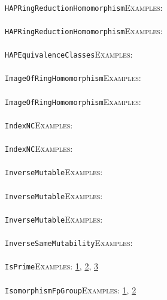 \documentclass[a4paper,11pt]{report}
\begin{document}
{{ \\
 \texttt{HAPRingReductionHomomorphism}{\nobreakspace}{\nobreakspace}{\nobreakspace}{\nobreakspace}\textsc{Examples:} \\
 \\
 \texttt{HAPRingReductionHomomorphism}{\nobreakspace}{\nobreakspace}{\nobreakspace}{\nobreakspace}\textsc{Examples:} \\
 \\
 \texttt{HAP{\textunderscore}EquivalenceClasses}{\nobreakspace}{\nobreakspace}{\nobreakspace}{\nobreakspace}\textsc{Examples:} \\
 \\
 \texttt{ImageOfRingHomomorphism}{\nobreakspace}{\nobreakspace}{\nobreakspace}{\nobreakspace}\textsc{Examples:} \\
 \\
 \texttt{ImageOfRingHomomorphism}{\nobreakspace}{\nobreakspace}{\nobreakspace}{\nobreakspace}\textsc{Examples:} \\
 \\
 \texttt{IndexNC}{\nobreakspace}{\nobreakspace}{\nobreakspace}{\nobreakspace}\textsc{Examples:} \\
 \\
 \texttt{IndexNC}{\nobreakspace}{\nobreakspace}{\nobreakspace}{\nobreakspace}\textsc{Examples:} \\
 \\
 \texttt{InverseMutable}{\nobreakspace}{\nobreakspace}{\nobreakspace}{\nobreakspace}\textsc{Examples:} \\
 \\
 \texttt{InverseMutable}{\nobreakspace}{\nobreakspace}{\nobreakspace}{\nobreakspace}\textsc{Examples:} \\
 \\
 \texttt{InverseMutable}{\nobreakspace}{\nobreakspace}{\nobreakspace}{\nobreakspace}\textsc{Examples:} \\
 \\
 \texttt{InverseSameMutability}{\nobreakspace}{\nobreakspace}{\nobreakspace}{\nobreakspace}\textsc{Examples:} \\
 \\
 \texttt{IsPrime}{\nobreakspace}{\nobreakspace}{\nobreakspace}{\nobreakspace}\textsc{Examples:} \href{tutorial/chap10.html} {1}{\nobreakspace}, \href{../www/SideLinks/About/aboutSchurMultiplier.html} {2}{\nobreakspace}, \href{../www/SideLinks/About/aboutTensorSquare.html} {3}{\nobreakspace} \\
 \\
 \texttt{IsomorphismFpGroup}{\nobreakspace}{\nobreakspace}{\nobreakspace}{\nobreakspace}\textsc{Examples:} \href{../www/SideLinks/About/aboutArithmetic.html} {1}{\nobreakspace}, \href{../www/SideLinks/About/aboutRosenbergerMonster.html} {2}{\nobreakspace} \\
}}
\end{document}
